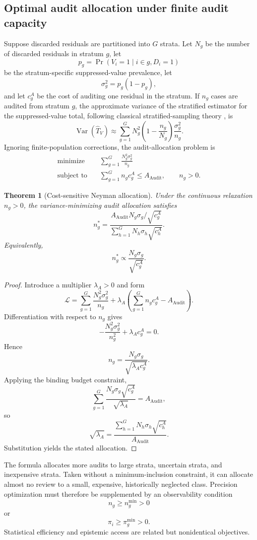 \documentclass[11pt]{article}
\newtheorem{theorem}[definition]{Theorem}
\theoremstyle{definition}
\DeclareMathOperator{\Audit}{Audit}
\DeclareMathOperator{\Var}{Var}
\DeclareMathOperator{\Prob}{Pr}
\begin{document}
\subsection{Optimal audit allocation under finite audit capacity}

Suppose discarded residuals are partitioned into \(G\) strata. Let \(N_g\) be the number of discarded residuals in stratum \(g\), let
\[
p_g
=
\Prob(V_i=1\mid i\in g,D_i=1)
\]
be the stratum-specific suppressed-value prevalence, let
\[
\sigma_g^2=p_g(1-p_g),
\]
and let \(c_g^{A}\) be the cost of auditing one residual in the stratum. If \(n_g\) cases are audited from stratum \(g\), the approximate variance of the stratified estimator for the suppressed-value total, following classical stratified-sampling theory \cite{cochran1977}, is
\[
\Var(\widehat{T}_V)
\approx
\sum_{g=1}^{G}
N_g^2
\left(
1-\frac{n_g}{N_g}
\right)
\frac{\sigma_g^2}{n_g}.
\]
Ignoring finite-population corrections, the audit-allocation problem is
\[
\begin{aligned}
\text{minimize}\quad&
\sum_{g=1}^{G}
\frac{N_g^2\sigma_g^2}{n_g}
\\
\text{subject to}\quad&
\sum_{g=1}^{G}n_gc_g^{A}
\leq
A_{\Audit},
\qquad
n_g>0.
\end{aligned}
\]

\begin{theorem}[Cost-sensitive Neyman allocation]
Under the continuous relaxation \(n_g>0\), the variance-minimizing audit allocation satisfies
\[
n_g^{*}
=
\frac{
A_{\Audit}
N_g\sigma_g/\sqrt{c_g^{A}}
}{
\sum_{h=1}^{G}
N_h\sigma_h\sqrt{c_h^{A}}
}.
\]
Equivalently,
\[
n_g^{*}
\propto
\frac{N_g\sigma_g}{\sqrt{c_g^{A}}}.
\]
\end{theorem}

\begin{proof}
Introduce a multiplier \(\lambda_A>0\) and form
\[
\mathcal{L}
=
\sum_{g=1}^{G}
\frac{N_g^2\sigma_g^2}{n_g}
+
\lambda_A
\left(
\sum_{g=1}^{G}n_gc_g^{A}-A_{\Audit}
\right).
\]
Differentiation with respect to \(n_g\) gives
\[
-\frac{N_g^2\sigma_g^2}{n_g^2}
+
\lambda_Ac_g^{A}
=
0.
\]
Hence
\[
n_g
=
\frac{N_g\sigma_g}{\sqrt{\lambda_Ac_g^{A}}}.
\]
Applying the binding budget constraint,
\[
\sum_{g=1}^{G}
\frac{N_g\sigma_g\sqrt{c_g^{A}}}{\sqrt{\lambda_A}}
=
A_{\Audit},
\]
so
\[
\sqrt{\lambda_A}
=
\frac{
\sum_{h=1}^{G}
N_h\sigma_h\sqrt{c_h^{A}}
}{
A_{\Audit}
}.
\]
Substitution yields the stated allocation.
\end{proof}

The formula allocates more audits to large strata, uncertain strata, and inexpensive strata. Taken without a minimum-inclusion constraint, it can allocate almost no review to a small, expensive, historically neglected class. Precision optimization must therefore be supplemented by an observability condition
\[
n_g\geq n_g^{\min}>0
\]
or
\[
\pi_i\geq\pi_g^{\min}>0.
\]
Statistical efficiency and epistemic access are related but nonidentical objectives.
\end{document}
